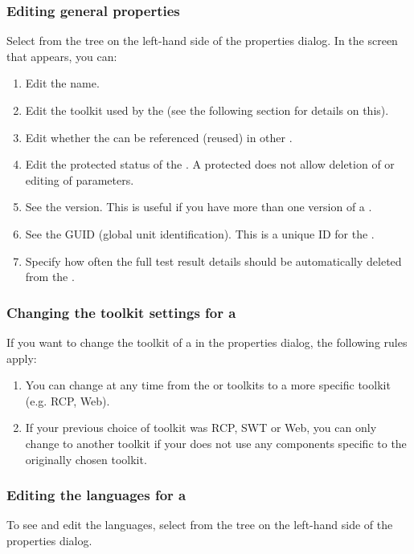 \subsubsection{Editing general \gdproject{} properties}
\label{ProjPropertiesGeneral}
Select  from the tree on the left-hand side of the \gdproject{} properties dialog. In the screen that appears, you can:
\begin{enumerate}
\item Edit the \gdproject{} name. 
\item Edit the toolkit used by the \gdproject{} (see the following section  for details on this). 
\item Edit whether the \gdproject{} can be referenced (reused) in other \gdprojects{}.
\item Edit the protected status of the \gdproject{}. A protected \gdproject{} does not allow deletion of \gdcases{} or editing of parameters. 
\item See the \gdproject{} version. This is useful if you have more than one version of a \gdproject{}. 
\item See the GUID (global unit identification). This is a unique ID for the \gdproject{}. 
\item Specify how often the full test result details  should be automatically deleted from the \gddb{}.
\end{enumerate}

\subsubsection{Changing the toolkit settings for a \gdproject{}}
\label{ProjPropertiesChangingToolkit}
If you want to change the toolkit of a \gdproject{} in the \gdproject{} properties dialog, the following rules apply:
\begin{enumerate}
\item You can change at any time from the  or  toolkits to a more specific toolkit (e.g. RCP, Web). 
\item If your previous choice of toolkit was RCP, SWT or Web, you can only change to another toolkit if your \gdproject{} does not use any components specific to the originally chosen toolkit. 
\end{enumerate}

\subsubsection{Editing the languages for a \gdproject}
\label{ProjPropertiesLanguage}
To see and edit the \gdproject{} languages, select  from the tree on the left-hand side of the \gdproject{} properties dialog. 

